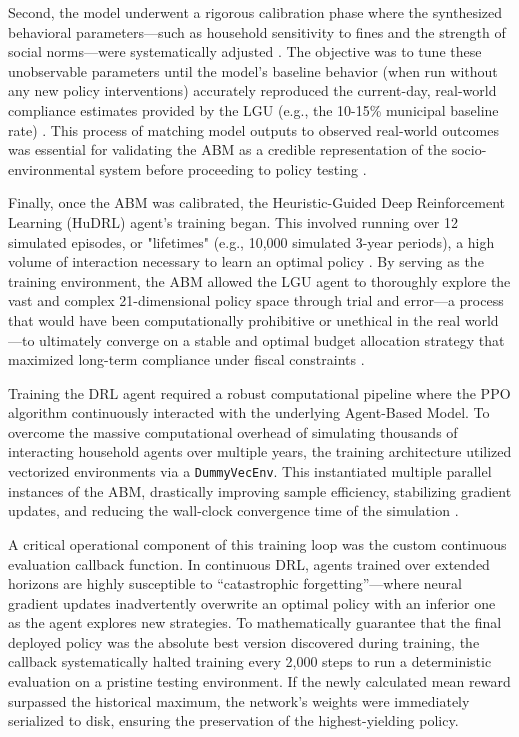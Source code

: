 Second, the model underwent a rigorous calibration phase where the synthesized behavioral parameters—such as household sensitivity to fines and the strength of social norms—were systematically adjusted \citep{Taraghi2025, Ceschi2021}. The objective was to tune these unobservable parameters until the model's baseline behavior (when run without any new policy interventions) accurately reproduced the current-day, real-world compliance estimates provided by the LGU (e.g., the 10-15\% municipal baseline rate) \citep{Jimenez2025}. This process of matching model outputs to observed real-world outcomes was essential for validating the ABM as a credible representation of the socio-environmental system before proceeding to policy testing \citep{Ma2023}.

Finally, once the ABM was calibrated, the Heuristic-Guided Deep Reinforcement Learning (HuDRL) agent's training began. This involved running over 12 simulated episodes, or "lifetimes" (e.g., 10,000 simulated 3-year periods), a high volume of interaction necessary to learn an optimal policy \citep{Dey2025}. By serving as the training environment, the ABM allowed the LGU agent to thoroughly explore the vast and complex 21-dimensional policy space through trial and error—a process that would have been computationally prohibitive or unethical in the real world—to ultimately converge on a stable and optimal budget allocation strategy that maximized long-term compliance under fiscal constraints \citep{TianReview2024}.

Training the DRL agent required a robust computational pipeline where the PPO algorithm continuously interacted with the underlying Agent-Based Model. To overcome the massive computational overhead of simulating thousands of interacting household agents over multiple years, the training architecture utilized vectorized environments via a \texttt{DummyVecEnv}. This instantiated multiple parallel instances of the ABM, drastically improving sample efficiency, stabilizing gradient updates, and reducing the wall-clock convergence time of the simulation \citep{TianReview2024}.

A critical operational component of this training loop was the custom continuous evaluation callback function. In continuous DRL, agents trained over extended horizons are highly susceptible to ``catastrophic forgetting''—where neural gradient updates inadvertently overwrite an optimal policy with an inferior one as the agent explores new strategies. To mathematically guarantee that the final deployed policy was the absolute best version discovered during training, the callback systematically halted training every 2,000 steps to run a deterministic evaluation on a pristine testing environment. If the newly calculated mean reward surpassed the historical maximum, the network's weights were immediately serialized to disk, ensuring the preservation of the highest-yielding policy.

